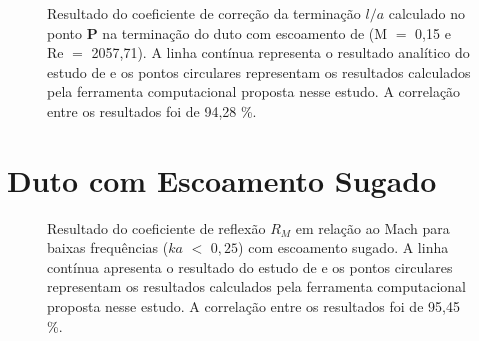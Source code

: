 \newpage
\begin{figure}[ht!]
\centering
  \caption[Coeficiente de Correção da Terminação $l/a$ com Escoamento de Exaustão (M $=$ 0,15)]{Resultado do coeficiente de correção da terminação $l/a$ calculado no ponto $\textbf{P}$ na terminação do duto com escoamento de (M $=$ 0,15 e Re $=$ 2057,71). A linha contínua representa o resultado analítico do estudo de  e os pontos circulares representam os resultados calculados pela ferramenta computacional proposta nesse estudo. A correlação entre os resultados foi de 94,28 \%.}
  \label{fig:loa_boca_015}
\end{figure}


\newpage
\section{Duto com Escoamento Sugado}

\begin{figure}[ht!]
\centering
  \caption[Coeficiente de reflexão $R_{M}$ com escoamento sugado]{Resultado do coeficiente de reflexão $R_{M}$ em relação ao Mach para baixas frequências ($ka$ $<$ $0,25$) com escoamento sugado. A linha contínua apresenta o resultado do estudo de  e os pontos circulares representam os resultados calculados pela ferramenta computacional proposta nesse estudo. A correlação entre os resultados foi de 95,45 \%.}

  \label{fig:abs_r_boca_sugado}
\end{figure}